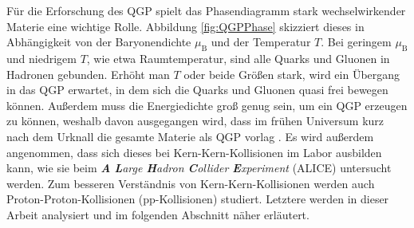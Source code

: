 \newline
Für die Erforschung des QGP spielt das Phasendiagramm stark wechselwirkender Materie eine wichtige Rolle.
Abbildung \ref{fig:QGPPhase} skizziert dieses in Abhängigkeit von der Baryonendichte $\mu_{\text{B}}$ und der Temperatur $T$.
Bei geringem $\mu_{\text{B}}$ und niedrigem $T$, wie etwa Raumtemperatur, sind alle Quarks und Gluonen in Hadronen gebunden.
Erhöht man $T$ oder beide Größen stark, wird ein Übergang in das QGP erwartet, in dem sich die Quarks und Gluonen quasi frei bewegen können.
Außerdem muss die Energiedichte groß genug sein, um ein QGP erzeugen zu können, weshalb davon ausgegangen wird, dass im frühen Universum kurz nach dem Urknall die gesamte Materie als QGP vorlag \cite{Kapusta:2000fe}. 
Es wird außerdem angenommen, dass sich dieses bei Kern-Kern-Kollisionen im Labor ausbilden kann, wie sie beim \textit{\textbf{A} \textbf{L}arge \textbf{H}adron \textbf{C}ollider \textbf{E}xperiment} (ALICE) untersucht werden.
\newline
Zum besseren Verständnis von Kern-Kern-Kollisionen werden auch Proton-Proton-Kollisionen (pp-Kollisionen) studiert.
Letztere werden in dieser Arbeit analysiert und im folgenden Abschnitt näher erläutert.